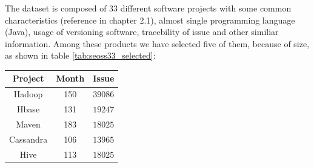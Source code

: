 \documentclass[%
    corpo=12pt,
    twoside,
    oldstyle,
    autoretitolo,
    greek,
    evenboxes,
]{toptesi}
\begin{document}
The dataset is composed of 33 different software projects with some common characteristics (reference in  \cite{SEOSS33} chapter 2.1), almost single programming language (Java), usage of versioning software, tracebility of issue and other similiar information. Among these products we have selected five of them, because of size, as shown in table \ref{tab:seoss33_selected}:

\begin{center}
   \label{tab:seoss33_selected}
  \begin{tabular}{ |c|c|c| }
     \hline
     \textbf{Project} & \textbf{Month} & \textbf{Issue} \\
     \hline
     \hline
     Hadoop & 150 & $39086$ \\
     Hbase & 131 & $19247$ \\
     Maven & 183 & $18025$ \\
     Cassandra & 106 & $13965$ \\
     Hive & 113 & $18025$ \\
     \hline
  \end{tabular}
\end{center}


%
\end{document}
